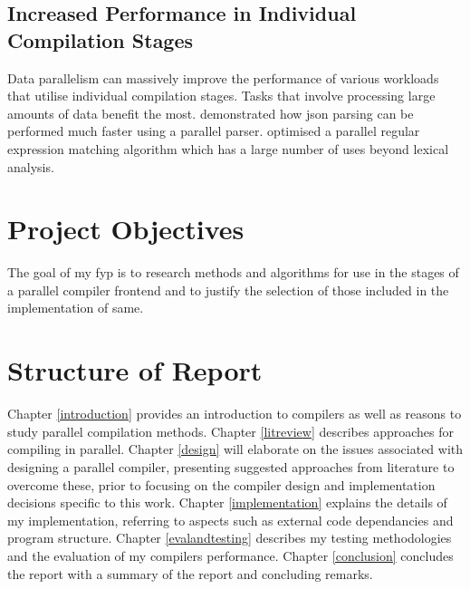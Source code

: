 \subsection{Increased Performance in Individual Compilation Stages}

Data parallelism can massively improve the performance of various workloads
that utilise individual compilation stages. Tasks that involve processing large
amounts of data benefit the most. \cite{barenghi_parallel_2015} demonstrated
how \gls{json} parsing can be performed much faster using a parallel parser.
\cite{mytkowicz_data-parallel_2014} optimised a parallel regular expression
matching algorithm which has a large number of uses beyond lexical analysis.

\section{Project Objectives}

The goal of my \gls{fyp} is to research methods and algorithms for use in the stages
of a parallel compiler frontend and to justify the selection of those included
in the implementation of same.

\section{Structure of Report} \label{structure_of_report}

Chapter \ref{introduction} provides an introduction to compilers as well as
reasons to study parallel compilation methods.
\newline \newline
Chapter \ref{litreview} describes approaches for compiling
in parallel.
\newline \newline
Chapter \ref{design} will elaborate on the issues associated with designing a
parallel compiler, presenting suggested approaches from literature to overcome
these, prior to focusing on the compiler design and implementation decisions
specific to this work.
\newline \newline
Chapter \ref{implementation} explains the details of my implementation,
referring to aspects such as external code dependancies and program structure.
\newline \newline
Chapter \ref{evalandtesting} describes my testing methodologies and the
evaluation of my compilers performance.
\newline \newline
Chapter \ref{conclusion} concludes the report with a summary of the report and
concluding remarks.
